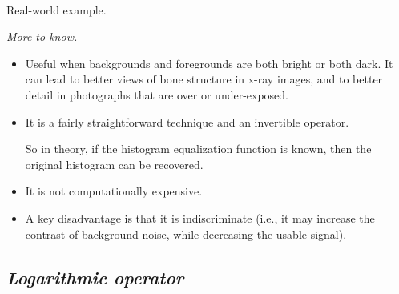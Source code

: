 \documentclass{response}
\begin{document}
{\mbox{}\\
Real-world example.


\newpage

\bigskip

{\huge \em More to know.}
\vspace{1cm}

\begin{itemize}\setlength\itemsep{-0.5em}
\item Useful when backgrounds and foregrounds are both bright or both dark. It can lead to better views of bone structure in x-ray images, and to better detail in photographs that are over or under-exposed. 

\item It is a fairly straightforward technique and an invertible operator. 

So in theory, if the histogram equalization function is known, then the original histogram can be recovered.

\item It is not computationally expensive.
\item A key disadvantage is that it is indiscriminate (i.e., it may increase the contrast of background noise, while decreasing the usable signal).
\end{itemize}

}



\newpage

\subsection*{\Huge\em Logarithmic operator}
\bigskip
\end{document}

